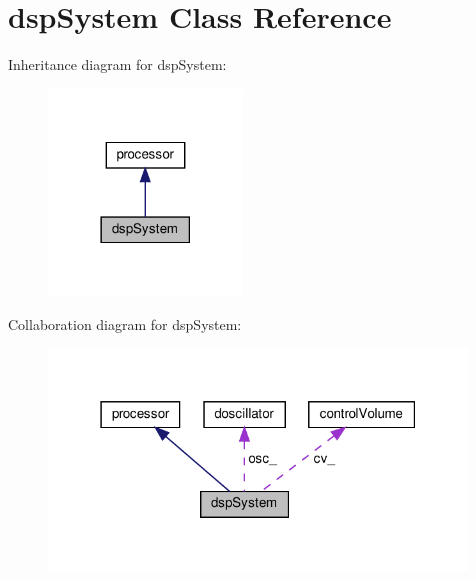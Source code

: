 \hypertarget{classdspSystem}{}\section{dsp\+System Class Reference}
\label{classdspSystem}


Inheritance diagram for dsp\+System\+:
\nopagebreak
\begin{figure}[H]
\begin{center}
\leavevmode
\includegraphics[width=146pt]{classdspSystem__inherit__graph}
\end{center}
\end{figure}


Collaboration diagram for dsp\+System\+:
\nopagebreak
\begin{figure}[H]
\begin{center}
\leavevmode
\includegraphics[width=315pt]{classdspSystem__coll__graph}
\end{center}
\end{figure}

